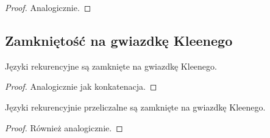 \begin{proof}
    Analogicznie.
\end{proof}

\subsection{Zamkniętość na gwiazdkę Kleenego}

\begin{theorem}
    Języki rekurencyjne są zamknięte na gwiazdkę Kleenego.
\end{theorem}

\begin{proof}
    Analogicznie jak konkatenacja.
\end{proof}

\begin{theorem}
    Języki rekurencyjnie przeliczalne są zamknięte na gwiazdkę Kleenego.
\end{theorem}

\begin{proof}
    Również analogicznie.
\end{proof}
